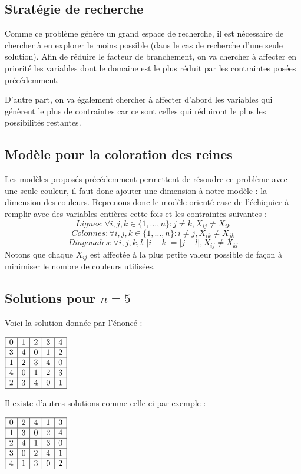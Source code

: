 \subsection{Stratégie de recherche}
Comme ce problème génère un grand espace de recherche, il est nécessaire de chercher à en explorer le moins possible (dans le cas de recherche d'une seule solution). Afin de réduire le facteur de branchement, on va chercher à affecter en priorité les variables dont le domaine est le plus réduit par les contraintes posées précédemment.

D'autre part, on va également chercher à affecter d'abord les variables qui génèrent le plus de contraintes car ce sont celles qui réduiront le plus les possibilités restantes.

\subsection{Modèle pour la coloration des reines}
Les modèles proposés précédemment permettent de résoudre ce problème avec une seule couleur, il faut donc ajouter une dimension à notre modèle : la dimension des couleurs. Reprenons donc le modèle orienté case de l'échiquier à remplir avec des variables entières cette fois et les contraintes suivantes :
$$ Lignes : \forall i,j,k \in \{1,\ldots,n\} : j \ne k, X_{ij} \ne X_{ik} $$
$$ Colonnes : \forall i,j,k \in \{1,\ldots,n\} : i \ne j, X_{ik} \ne X_{jk} $$
$$ Diagonales : \forall i,j,k,l : |i - k| = |j-l| , X_{ij} \ne X_{kl}$$
Notons que chaque $X_{ij}$ est affectée à la plus petite valeur possible de façon à minimiser le nombre de couleurs utilisées.

\subsection{Solutions pour $n = 5$}
Voici la solution donnée par l'énoncé :

$\begin{array}{|c|c|c|c|c|}
\hline
0 & 1 & 2 & 3 & 4 \\ \hline
3 & 4 & 0 & 1 & 2 \\ \hline
1 & 2 & 3 & 4 & 0 \\ \hline
4 & 0 & 1 & 2 & 3 \\ \hline
2 & 3 & 4 & 0 & 1 \\ \hline
\end{array}$

Il existe d'autres solutions comme celle-ci par exemple :

$\begin{array}{|c|c|c|c|c|}
\hline
0 & 2 & 4 & 1 & 3 \\ \hline
1 & 3 & 0 & 2 & 4 \\ \hline
2 & 4 & 1 & 3 & 0 \\ \hline
3 & 0 & 2 & 4 & 1 \\ \hline
4 & 1 & 3 & 0 & 2 \\ \hline
\end{array}$

